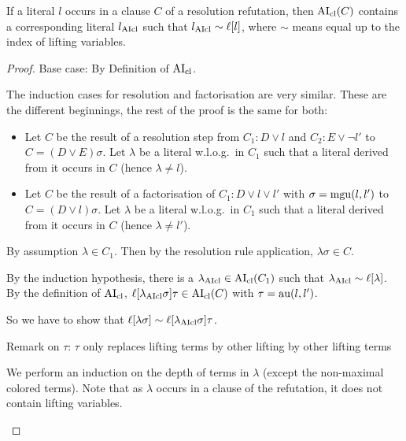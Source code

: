 \documentclass[,%
	paper=a4,%
	DIV12, %
	twoside=false,%
	liststotoc,
	bibtotoc,
	draft=false,%
	numbers=noendperiod
]{scrartcl}
\begin{document}
\begin{lemma} 
	\label{lemma:literal_in_clause_similar}
	If a literal $l$ occurs in a clause $C$ of a resolution refutation,
	then $\operatorname{AI}_\mathrm{cl}(C)$ contains a corresponding literal $l_{\operatorname{AIcl}}$ such that $l_{\operatorname{AIcl}} \sim \ell[l]$, where $\sim$ means equal up to the index of lifting variables.
\end{lemma}
\begin{proof}
	Base case: By Definition of $\operatorname{AI}_\mathrm{cl}$.

	The induction cases for resolution and factorisation are very similar. These are the different beginnings, the rest of the proof is the same for both:

	\begin{itemize}
		\item
			Let $C$ be the result of a resolution step from $C_1: D\lor l$ and $C_2: E\lor \lnot l'$ to $C = (D \lor E)\sigma$.
			Let $\lambda$ be a literal w.l.o.g.\ in $C_1$ such that a literal derived from it occurs in $C$ (hence $\lambda \neq l$). 

		\item
			Let $C$ be the result of a factorisation of $C_1: D \lor l \lor l'$ with $\sigma = \operatorname{mgu}(l, l')$ to $C = (D \lor l)\sigma$. 
			Let $\lambda$ be a literal w.l.o.g.\ in $C_1$ such that a literal derived from it occurs in $C$ (hence $\lambda \neq l'$). 
	\end{itemize}


	By assumption $\lambda \in C_1$. Then by the resolution rule application, $\lambda\sigma \in C$.

	\newcommand{\lclOne}{\lambda\cl}
	By the induction hypothesis, there is a $\lclOne \in \AIclause(C_1)$ such that $\lclOne \sim \lifboth{\lambda}$.
	By the definition of $\operatorname{AI}_\mathrm{cl}$, $\lifboth{\lclOne\sigma}\tau \in \AIclause(C)$ 
	with $\tau = \operatorname{au}(l, l')$.

	So we have to show that $\ell[ \lambda \sigma ]  \sim \ell[\lambda_{\operatorname{AIcl}}\sigma]\tau$.

	Remark on $\tau$: $\tau$ only replaces lifting terms by other lifting by other lifting terms

	We perform an induction on the depth of terms in $\lambda$ (except the non-maximal colored terms). Note that as $\lambda$ occurs in a clause of the refutation, it does not contain lifting variables.
	\begin{itemize}
			\begin{comment} NO LIFTING VARS!
			\item Suppose $t$ is a term of size $1$ in $\lambda$ and it is a lifting variable, say $z_i$.
				Then by Lemma~\ref{lemma:no_lifting_vars_in_subst}, $t\sigma = t$ and also $\lifboth{t\sigma} = t$.


\end{comment}
\end{itemize}
\end{proof}
\end{document}
